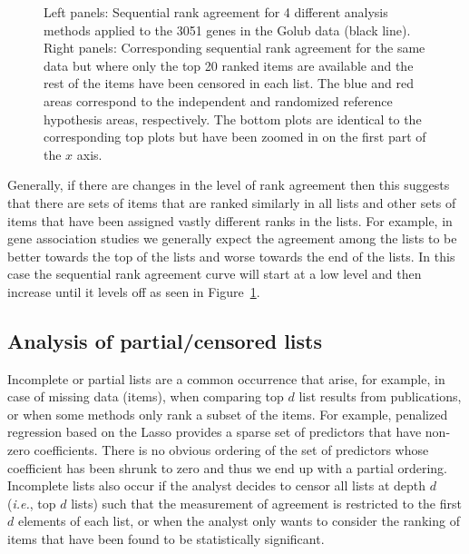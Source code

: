 \documentclass[12pt,a4paper]{article}
\makeatletter
\newcommand{\ie}{\emph{i.e.}\@\xspace}
\theoremstyle{plain}
\makeatother
\begin{document}
\begin{figure}[htbp]
\begin{center}
 \end{center}
 \caption{Left panels: Sequential rank agreement for 4 different
   analysis methods applied to the 3051 genes in the Golub data (black
   line). Right
   panels: Corresponding sequential rank agreement for the same data
   but where only the top 20 ranked items are available and the rest
   of the items have been censored in each list. The blue and
   red areas correspond to the independent and randomized reference
   hypothesis areas, respectively. The bottom plots are identical to
   the corresponding top plots but have been zoomed in on the first
   part of the $x$ axis.}
 \label{fig:example1}
 \end{figure}

 Generally, if there are changes in the level of
 rank agreement then this suggests that there are sets of items that
 are ranked similarly in all lists and other sets of items that have
 been assigned vastly different ranks in the lists. For example, in gene
 association studies we generally expect the agreement among the lists
 to be better towards the top of the lists and worse towards the end
 of the lists. In this case the sequential rank agreement curve will
 start at a low level and then increase until it levels off as seen in
 Figure~\ref{fig:example1}.

\subsection{Analysis of partial/censored lists}
Incomplete or partial lists are a common occurrence that arise, for
example, in case of missing data (items), when comparing top $d$ list
results from publications, or when some methods only rank a subset of
the items. For example, penalized regression based on the Lasso
provides a sparse set of predictors that have non-zero
coefficients. There is no obvious ordering of the set of predictors
whose coefficient has been shrunk to zero and thus we end up with a
partial ordering. Incomplete lists also occur if the analyst decides
to censor all lists at depth $d$ (\ie, top $d$ lists) such that the
measurement of agreement is restricted to the first $d$ elements of
each list, or when the analyst only wants to consider the ranking of
items that have been found to be statistically significant.
\end{document}
